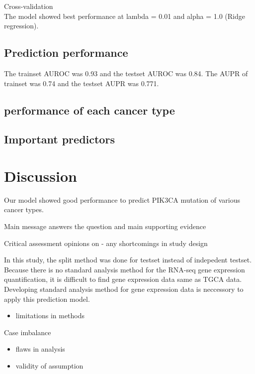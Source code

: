 \documentclass[10pt,letterpaper]{article}
\providecommand{\tightlist}{%
  \setlength{\itemsep}{0pt}\setlength{\parskip}{0pt}}
\begin{document}
Cross-validation\\
The model showed best performance at lambda = 0.01 and alpha = 1.0
(Ridge regression).

\hypertarget{prediction-performance}{%
\subsection{Prediction performance}\label{prediction-performance}}

The trainset AUROC was 0.93 and the testset AUROC was 0.84. The AUPR of
trainset was 0.74 and the testset AUPR was 0.771.

\hypertarget{performance-of-each-cancer-type}{%
\subsection{performance of each cancer
type}\label{performance-of-each-cancer-type}}

\hypertarget{important-predictors}{%
\subsection{Important predictors}\label{important-predictors}}

\hypertarget{discussion}{%
\section{Discussion}\label{discussion}}

Our model showed good performance to predict PIK3CA mutation of various
cancer types.

Main message answers the question and main supporting evidence

Critical assessment opinions on - any shortcomings in study design

In this study, the split method was done for testset instead of
indepedent testset. Because there is no standard analysis method for the
RNA-seq gene expression quantification, it is difficult to find gene
expression data same as TGCA data. Developing standard analysis method
for gene expression data is neccessory to apply this prediction model.

\begin{itemize}
\tightlist
\item
  limitations in methods
\end{itemize}

Case imbalance

\begin{itemize}
\item
  flaws in analysis
\item
  validity of assumption
\end{itemize}
\end{document}
